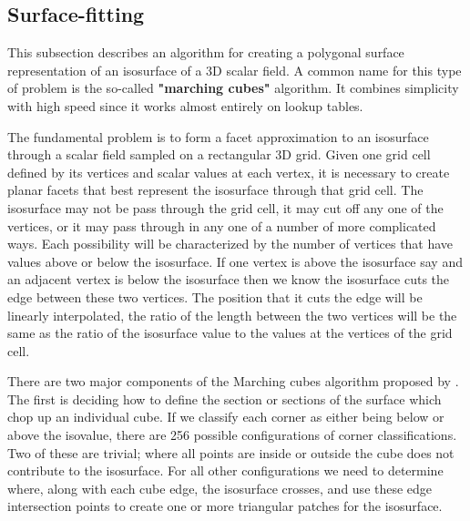 \subsection{Surface-fitting}

This subsection describes an algorithm for creating a polygonal surface representation of an isosurface of a 3D scalar field. A common name for this type of problem is the so-called \textbf{ "marching cubes" } algorithm. It combines simplicity with high speed since it works almost entirely on lookup tables.

The fundamental problem is to form a facet approximation to an isosurface through a scalar field sampled on a rectangular 3D grid. Given one grid cell defined by its vertices and scalar values at each vertex, it is necessary to create planar facets that best represent the isosurface through that grid cell. The isosurface may not be pass through the grid cell, it may cut off any one of the vertices, or it may pass through in any one of a number of more complicated ways. Each possibility will be characterized by the number of vertices that have values above or below the isosurface. If one vertex is above the isosurface say and an adjacent vertex is below the isosurface then we know the isosurface cuts the edge between these two vertices. The position that it cuts the edge will be linearly interpolated, the ratio of the length between the two vertices will be the same as the ratio of the isosurface value to the values at the vertices of the grid cell.


There are two major components of the Marching cubes algorithm proposed by \cite{Lorensen:1987:MCA}. The first is deciding how to define the section or sections of the surface which chop up an individual cube. If we classify each corner as either being below or above the isovalue, there are 256 possible configurations of corner classifications. Two of these are trivial; where all points are inside or outside the cube does not contribute to the isosurface. For all other configurations we need to determine where, along with each cube edge, the isosurface crosses, and use these edge intersection points to create one or more triangular patches for the isosurface.


